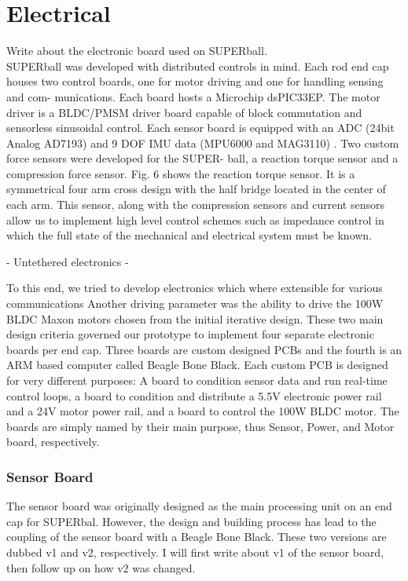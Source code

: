 \section{Electrical}
Write about the electronic board used on SUPERball.\\

SUPERball  was  developed  with  distributed  controls  in
mind.  Each  rod  end  cap  houses  two  control  boards,  one
for  motor  driving  and  one  for  handling  sensing  and  com-
munications. Each board hosts a Microchip dsPIC33EP. The
motor driver is a BLDC/PMSM driver board capable of block
commutation and sensorless sinusoidal control. Each sensor
board is equipped with an ADC
(24bit Analog AD7193)
and
9 DOF IMU data
(MPU6000 and MAG3110)
.
Two custom force sensors were developed for the SUPER-
ball, a reaction torque sensor and a compression force sensor.
Fig. 6 shows the reaction torque sensor. It is a symmetrical
four  arm  cross  design  with  the  half  bridge  located  in  the
center of each arm. This sensor, along with the compression
sensors and current sensors allow us to implement high level
control schemes such as impedance control in which the full
state of the mechanical and electrical system must be known.

- Untethered electronics
- 

To this end, we tried to develop electronics which where extensible for various communications
Another driving parameter was the ability to drive the 100W BLDC Maxon motors chosen from the initial iterative design.
These two main design criteria governed our prototype to implement four separate electronic boards per end cap.
Three boards are custom designed PCBs and the fourth is an ARM based computer called Beagle Bone Black.
Each custom PCB is designed for very different purposes: A board to condition sensor data and run real-time control loops, a board to condition and distribute a 5.5V electronic power rail and a 24V motor power rail, and a board to control the 100W BLDC motor. 
The boards are simply named by their main purpose, thus Sensor, Power, and Motor board, respectively.

\subsubsection{Sensor Board}
The sensor board was originally designed as the main processing unit on an end cap for SUPERbal. 
However, the design and building process has lead to the coupling of the sensor board with a Beagle Bone Black.
These two versions are dubbed v1 and v2, respectively.
I will first write about v1 of the sensor board, then follow up on how v2 was changed.\\

